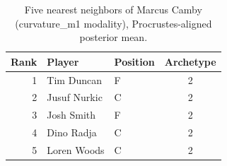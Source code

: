 \begin{table}[htbp]
  \centering\small
  \begin{tabular}{rllc}
    \toprule
    Rank & Player & Position & Archetype \\
    \midrule
    1 & Tim Duncan & F & 2 \\
    2 & Jusuf Nurkic & C & 2 \\
    3 & Josh Smith & F & 2 \\
    4 & Dino Radja & C & 2 \\
    5 & Loren Woods & C & 2 \\
    \bottomrule
  \end{tabular}
  \caption{Five nearest neighbors of Marcus Camby (curvature_m1 modality), Procrustes-aligned posterior mean.}
  \label{tab:Marcus_Camby_neighbors_curvature_m1}
\end{table}

